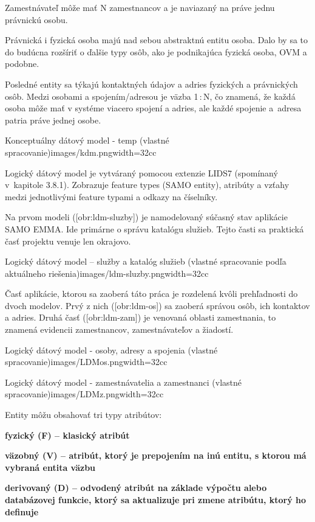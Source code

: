 Zamestnávateľ môže mať N zamestnancov a je naviazaný na práve jednu právnickú osobu. 

Právnická i fyzická osoba majú nad sebou abstraktnú entitu osoba. Dalo by sa to do budúcna rozšíriť o ďalšie typy osôb, ako je podnikajúca fyzická osoba, OVM a podobne. 

Posledné entity sa týkajú kontaktných údajov a adries fyzických a právnických osôb. Medzi osobami a spojením/adresou je väzba 1\,:\,N, čo znamená, že každá osoba môže mať v systéme viacero spojení a adries, ale každé spojenie a~adresa patria práve jednej osobe.


{Konceptuálny dátový model - temp (vlastné spracovanie)}{images/kdm.png}{width=32cc}

\zlom
{}
Logický dátový model je vytváraný pomocou extenzie LIDS7 (spomínaný v~kapitole 3.8.1). Zobrazuje feature types (SAMO entity), atribúty a vzťahy medzi jednotlivými feature typami a odkazy na číselníky.

Na prvom modeli ([obr:ldm-sluzby]) je namodelovaný súčasný stav aplikácie SAMO EMMA. Ide primárne o správu katalógu služieb. Tejto časti sa praktická časť projektu venuje len okrajovo.

{Logický dátový model -- služby a katalóg služieb (vlastné spracovanie podľa aktuálneho riešenia)}{images/ldm-sluzby.png}{width=32cc}

Časť aplikácie, ktorou sa zaoberá táto práca je rozdelená kvôli prehľadnosti do dvoch modelov. Prvý z nich ([obr:ldm-os]) sa zaoberá správou osôb, ich kontaktov a adries. Druhá časť ([obr:ldm-zam]) je venovaná oblasti zamestnania, to znamená evidencii zamestnancov, zamestnávateľov a žiadostí.

{Logický dátový model - osoby, adresy a spojenia (vlastné spracovanie)}{images/LDMos.png}{width=32cc}

{Logický dátový model - zamestnávatelia a zamestnanci (vlastné spracovanie)}{images/LDMz.png}{width=32cc}


Entity môžu obsahovať tri typy atribútov:

\startitemize
\item {\start\bf fyzický (F) \stop -- klasický atribút}
\item {\start\bf väzobný (V) \stop -- atribút, ktorý je prepojením na inú entitu, s ktorou má vybraná entita väzbu}
\item {\start\bf derivovaný (D) \stop -- odvodený atribút na základe výpočtu alebo databázovej funkcie, ktorý sa aktualizuje pri zmene atribútu, ktorý ho definuje}
\stopitemize

